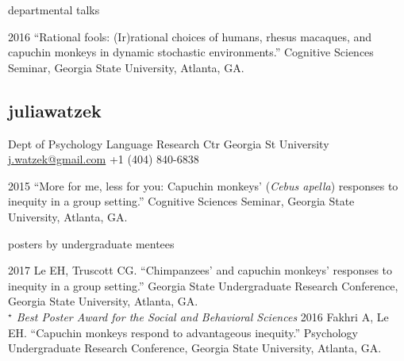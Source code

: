 \documentclass[]{friggeri-cv}
\begin{document}

{\subfont\large{} departmental talks}

\begin{entrylist2}
  \entrytwo
    {2016}
    {``Rational fools: (Ir)rational choices of humans, rhesus macaques, and capuchin monkeys in dynamic stochastic environments.'' Cognitive Sciences Seminar, Georgia State University, Atlanta, GA.}
\end{entrylist2}


\newpage
\thispagestyle{fancy}

\begin{aside}
  \section{{\normalfont julia}watzek}
    Dept of Psychology
    Language Research Ctr
    Georgia St University
    ~
    \href{mailto:j.watzek@gmail.com}{j.watzek@gmail.com}
    +1 (404) 840-6838
\end{aside}


\begin{entrylist2}
  \entrytwo
    {2015}
    {``More for me, less for you: Capuchin monkeys' (\emph{Cebus apella}) responses to inequity in a group setting.'' Cognitive Sciences Seminar, Georgia State University, Atlanta, GA.}
\end{entrylist2}


{\subfont\large{} posters by undergraduate mentees}

\begin{entrylist2}
  \entrytwo
    {2017}
    {Le EH, Truscott CG. ``Chimpanzees' and capuchin monkeys' responses to inequity in a group setting.'' Georgia State Undergraduate Research Conference, Georgia State University, Atlanta, GA.\\
    \emph{${}^\star$ Best Poster Award for the Social and Behavioral Sciences}}
  \entrytwo
    {2016}
    {Fakhri A, Le EH. ``Capuchin monkeys respond to advantageous inequity.'' Psychology Undergraduate Research Conference, Georgia State University, Atlanta, GA.}
\end{entrylist2}


\end{document}
